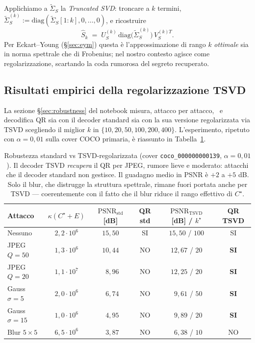 \documentclass[11pt,a4paper]{article}
\theoremstyle{definition}
\theoremstyle{remark}
\DeclareMathOperator{\PSNR}{PSNR}
\begin{document}
Applichiamo a $\widetilde\Sigma_S$ la \emph{Truncated SVD}: troncare a
$k$ termini, $\widetilde\Sigma_S^{(k)} := \mathrm{diag}(\widetilde\Sigma_S[1:k], 0, \dots, 0)$,
e ricostruire
\[
   \widehat{S}_k \;=\; U_S^{(k)} \, \mathrm{diag}\bigl(\widetilde\Sigma_S^{(k)}\bigr) \, V_S^{(k) T}.
\]
Per Eckart--Young (\S\ref{sec:eym}) questa \`e l'approssimazione di
rango $k$ \emph{ottimale} sia in norma spettrale che di Frobenius;
nel nostro contesto agisce come regolarizzazione, scartando la coda
rumorosa del segreto recuperato.

\subsection{Risultati empirici della regolarizzazione TSVD}

La sezione \S\ref{sec:robustness} del notebook misura, attacco per attacco,
\PSNR\ e decodifica QR sia con il decoder standard sia con la sua versione
regolarizzata via TSVD scegliendo il miglior $k$ in $\{10, 20, 50, 100, 200, 400\}$.
L'esperimento, ripetuto con $\alpha = 0{,}01$ sulla cover COCO primaria,
\`e riassunto in Tabella~\ref{tab:tsvd-rob}.

\begin{table}[H]\centering\small
\begin{tabular}{lccccc}
\toprule
\textbf{Attacco} & $\kappa(C^{\star}+E)$ & $\PSNR_{\text{std}}$ [dB] & QR std & $\PSNR_{\text{TSVD}}$ [dB] / $k^{\star}$ & QR TSVD \\
\midrule
Nessuno              & $2{,}2\!\cdot\!10^6$ & $15{,}50$ & SI & $15{,}50$ / $100$  & SI \\
JPEG $Q=50$          & $1{,}3\!\cdot\!10^6$ & $10{,}44$ & NO & $12{,}67$ / $20$   & \textbf{SI} \\
JPEG $Q=20$          & $1{,}1\!\cdot\!10^7$ & $\phantom{0}8{,}96$ & NO & $12{,}25$ / $20$ & \textbf{SI} \\
Gauss $\sigma=5$     & $2{,}0\!\cdot\!10^6$ & $\phantom{0}6{,}74$ & NO & $\phantom{0}9{,}61$ / $50$ & \textbf{SI} \\
Gauss $\sigma=15$    & $1{,}0\!\cdot\!10^6$ & $\phantom{0}4{,}95$ & NO & $\phantom{0}9{,}89$ / $20$ & \textbf{SI} \\
Blur $5\times 5$     & $6{,}5\!\cdot\!10^6$ & $\phantom{0}3{,}87$ & NO & $\phantom{0}6{,}38$ / $10$ & NO \\
\bottomrule
\end{tabular}
\caption{\label{tab:tsvd-rob}Robustezza standard vs TSVD-regolarizzata
(cover \texttt{coco\_000000000139}, $\alpha = 0{,}01$).  Il decoder
TSVD \emph{recupera} il QR per JPEG, rumore lieve e moderato:
attacchi che il decoder standard non gestisce.  Il guadagno medio in
PSNR \`e $+2$ a $+5$ dB.  Solo il blur, che distrugge la struttura
spettrale, rimane fuori portata anche per TSVD --- coerentemente con
il fatto che il blur riduce il rango effettivo di $C^{\star}$.}
\end{table}
\end{document}
